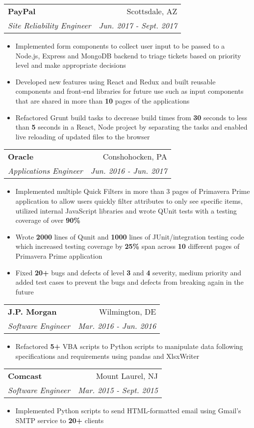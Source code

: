 \documentclass[letterpaper,10.5pt]{article}
\makeatletter
\newcommand{\resumeItem}[2]{
  \item\small{
    \textbf{#1}{#2 \vspace{-2pt}}
  }
}
\newcommand{\resumeSubheading}[4]{
  \vspace{-1pt}\item
    \begin{tabular*}{0.97\textwidth}[t]{l@{\extracolsep{\fill}}r}
      \textbf{#1} & #2 \\
      \textit{\small#3} & \textit{\small #4} \\
    \end{tabular*}\vspace{-5pt}
}
\newcommand{\resumeItemListStart}{\begin{itemize}}
\newcommand{\resumeItemListEnd}{\end{itemize}\vspace{-5pt}}
\makeatother
\begin{document}
    \resumeSubheading
      {PayPal}{Scottsdale, AZ}
      {Site Reliability Engineer}{Jun. 2017 - Sept. 2017}
      \resumeItemListStart
        \resumeItem{}
          {Implemented form components to collect user input to be passed to a Node.js, Express and MongoDB backend to triage tickets based on priority level and make appropriate decisions}
        \resumeItem{}
          {Developed new features using React and Redux and built reusable components and front-end libraries for future use such as input components that are shared in more than \textbf{10} pages of the applications}
        \resumeItem{}
          {Refactored Grunt build tasks to decrease build times from \textbf{30} seconds to less than \textbf{5} seconds in a React, Node project by separating the tasks and enabled live reloading of updated files to the browser}
      \resumeItemListEnd
      
    \resumeSubheading
      {Oracle}{Conshohocken, PA}
      {Applications Engineer}{Jun. 2016 - Jun. 2017}
      \resumeItemListStart
        \resumeItem{}
          {Implemented multiple Quick Filters in more than 3 pages of Primavera Prime application to allow users quickly filter attributes to only see specific items, utilized internal JavaScript libraries and wrote QUnit tests with a testing coverage of over \textbf{90\%}}
        \resumeItem{}
          {Wrote \textbf{2000} lines of Qunit and \textbf{1000} lines of JUnit/integration testing code which increased testing coverage by \textbf{25\%} span across \textbf{10} different pages of Primavera Prime application}
        \resumeItem{}
          {Fixed \textbf{20+} bugs and defects of level \textbf{3} and \textbf{4} severity, medium priority and added test cases to prevent the bugs and defects from breaking again in the future}
      \resumeItemListEnd
      
    \resumeSubheading
      {J.P. Morgan}{Wilmington, DE}
      {Software Engineer}{Mar. 2016 - Jun. 2016}
      \resumeItemListStart
        \resumeItem{}
          {Refactored \textbf{5+} VBA scripts to Python scripts to manipulate data following specifications and requirements using pandas and XlsxWriter}
      \resumeItemListEnd
      
    \resumeSubheading
      {Comcast}{Mount Laurel, NJ}
      {Software Engineer}{Mar. 2015 - Sept. 2015}
      \resumeItemListStart
        \resumeItem{}
          {Implemented Python scripts to send HTML-formatted email using Gmail’s SMTP service to \textbf{20+} clients}
      \resumeItemListEnd
\end{document}
